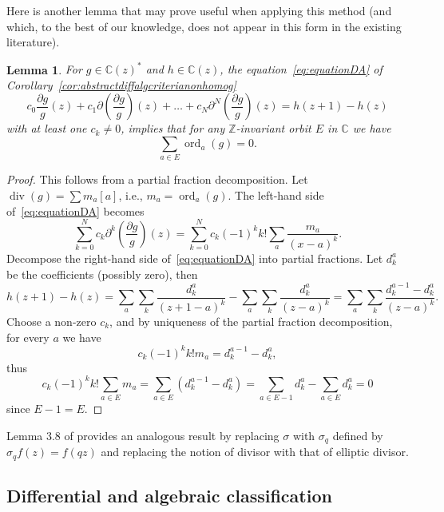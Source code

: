 \documentclass[11pt]{article}
\newcommand\citeS[1]{\cite{#1}}
\newtheorem{lemm}[thm]{Lemma}
\theoremstyle{definition}
\begin{document}
Here is another lemma that may prove useful when applying this method (and which, to the best of our knowledge, does not appear in this form in the existing literature).
\begin{lemm}%
For $g\in\mathbb{C}(z)^*$ and $h\in\mathbb{C}(z)$, the equation~\eqref{eq:equationDA} of Corollary~\ref{cor:abstractdiffalgcriterianonhomog} 
\[
c_0 \frac{\partial g }{g}(z) +c_1 \partial \left(\frac{\partial g}{g}\right) (z) +\dots +c_N \partial^N\left( \frac{\partial g}{g}\right)(z)= h(z+1)-h(z)
\]
with at least one $c_k \neq 0$, implies that for any $\mathbb{Z}$-invariant orbit $E$ in $\mathbb{C}$ we have
\[
\sum_{a \in E} \operatorname{ord}_a(g) = 0.
\]
\end{lemm}
\begin{proof}
This follows from a partial fraction decomposition. Let $\operatorname{div}(g)=\sum m_a [a]$, i.e., $m_a=\operatorname{ord}_a(g)$. The left-hand side of~\eqref{eq:equationDA} becomes
\[
\sum_{k=0}^N c_k \partial^k \left( \frac{\partial g}{g} \right)(z)=\sum_{k=0}^N c_k (-1)^k k!\sum_a \frac{m_a}{(x-a)^k} .
\]
Decompose the right-hand side of~\eqref{eq:equationDA} into partial fractions. Let $d_k^a$ be the coefficients (possibly zero), then
\[
h(z+1)-h(z)=\sum_a \sum_k \frac{d_k^a}{(z+1-a)^k}  - \sum_a \sum_k \frac{d_k^a}{(z-a)^k}=\sum_a\sum_k \frac{d_k^{a-1}-d_k^a}{(z-a)^k}.
\]
Choose a non-zero $c_k$, and by uniqueness of the partial fraction decomposition, for every $a$ we have
\[
c_k (-1)^k k! m_a = d_k^{a-1}-d_k^a,
\]
thus
\[
c_k (-1)^k k! \sum_{a\in E} m_a 
=\sum_{a\in E} (d_k^{a-1}-d_k^a)=\sum_{a\in E-1} d_k^a -\sum_{a\in E} d_k^a =0
\]
since $E-1=E$.
\end{proof}
Lemma 3.8 of \cite{Hardouin2008} provides an analogous result by replacing $\sigma$ with $\sigma_q$ defined by $\sigma_q f(z)=f(qz)$ and replacing the notion of divisor with that of elliptic divisor.


\subsection{Differential and algebraic classification}
\end{document}
